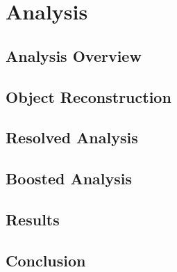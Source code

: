 \chapter{Analysis}
\label{chap:anal}

\section{Analysis Overview}

\section{Object Reconstruction}

\section{Resolved Analysis}
\label{sec:Resolved}

\section{Boosted Analysis}
\label{sec:Boosted}

\section{Results}

\section{Conclusion}



